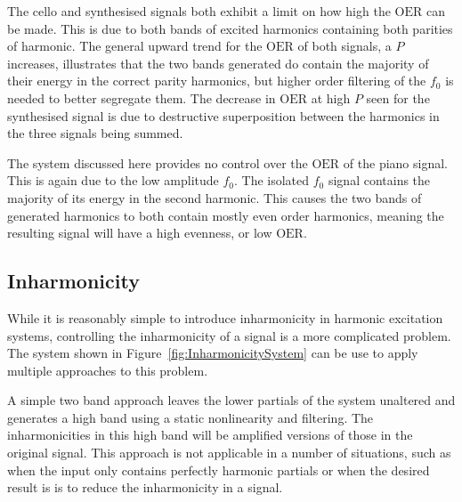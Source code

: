 		The cello and synthesised signals both exhibit a limit on how high the $\mathrm{OER}$ can be made. This is
		due to both bands of excited harmonics containing both parities of harmonic.  The general upward trend for
		the $\mathrm{OER}$ of both signals, a $P$ increases, illustrates that the two bands generated do contain
		the majority of their energy in the correct parity harmonics, but higher order filtering of the $f_{0}$ is
		needed to better segregate them. The decrease in $\mathrm{OER}$ at high $P$ seen for the synthesised signal
		is due to destructive superposition between the harmonics in the three signals being summed.

		The system discussed here provides no control over the $\mathrm{OER}$ of the piano signal. This is again
		due to the low amplitude $f_{0}$. The isolated $f_{0}$ signal contains the majority of its energy in the
		second harmonic. This causes the two bands of generated harmonics to both contain mostly even order
		harmonics, meaning the resulting signal will have a high evenness, or low $\mathrm{OER}$.

	\subsection{Inharmonicity}
	\label{sec:FeatureControl-Parameterisation-Inharmonicity}
		While it is reasonably simple to introduce inharmonicity in harmonic excitation systems, controlling the
		inharmonicity of a signal is a more complicated problem. The system shown in
		Figure~\ref{fig:InharmonicitySystem} can be use to apply multiple approaches to this problem. 

		A simple two band approach leaves the lower partials of the system unaltered and generates a high band
		using a static nonlinearity and filtering. The inharmonicities in this high band will be amplified versions
		of those in the original signal. This approach is not applicable in a number of situations, such as when
		the input only contains perfectly harmonic partials or when the desired result is is to reduce the
		inharmonicity in a signal.
		
